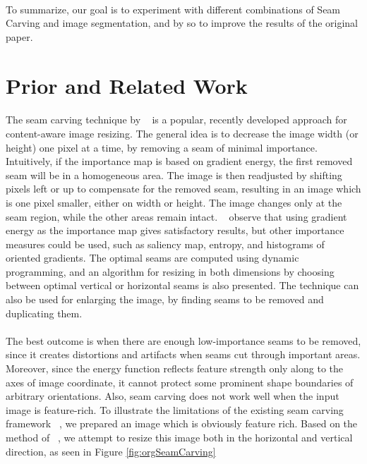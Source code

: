 \documentclass[conference]{acmsiggraph}
\begin{document}
\paragraph{}
To summarize, our goal is to experiment with different combinations of Seam Carving and image segmentation, and by so to improve the results of the original paper.


\section{Prior and Related Work}

\paragraph{}
The seam carving technique by ~\cite{Avidan2007} is a popular, recently developed approach for content-aware image resizing. The general idea is to decrease the image width (or height) one pixel at a time,  by removing a seam of minimal importance. Intuitively, if the importance map is based on gradient energy, the first removed seam will be in a homogeneous area. The image is then readjusted by shifting pixels left or up to compensate for the removed seam, resulting in an image which is one pixel smaller, either on width or height. The image changes only at the seam region, while the other areas remain intact. ~\cite{Avidan2007} observe that using gradient energy as the importance map gives satisfactory results, but other importance measures could be used, such as saliency map, entropy, and histograms of oriented gradients. The optimal seams are computed using dynamic programming, and an algorithm for resizing in both dimensions by choosing between optimal vertical or horizontal seams is also presented. The technique can also be used for enlarging the image, by finding seams to be removed and duplicating them. 

\paragraph{}
The best outcome is when there are enough low-importance seams to be removed, since it creates distortions and artifacts when seams cut through important areas. Moreover, since the energy function reflects feature strength only along to the axes  of image coordinate, it cannot protect some prominent shape boundaries of arbitrary orientations. Also, seam carving does not work well when the input image is feature-rich. To illustrate the limitations of the existing seam carving framework ~\cite{Avidan2007}, we prepared an image which is obviously feature rich. Based on the method of ~\cite{Avidan2007}, we attempt to resize this image both in the horizontal and vertical direction, as seen in Figure \ref{fig:orgSeamCarving}
\end{document}
